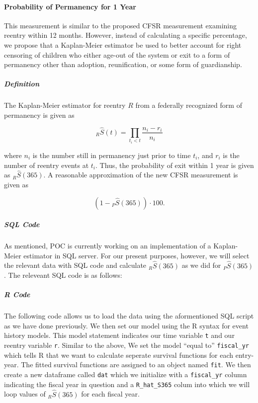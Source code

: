 \documentclass[12pt]{article}\usepackage[]{graphicx}\usepackage[]{color}
\begin{document}
\paragraph{Probability of Permanency for 1 Year} This measurement is similar to the proposed CFSR measurement examining reentry within 12 months. However, instead of calculating a specific percentage, we propose that a Kaplan-Meier estimator be used to better account for right censoring of children who either age-out of the system or exit to a form of permanency other than adoption, reunification, or some form of guardianship.

\subparagraph{Definition} The Kaplan-Meier estimator for reentry $R$ from a federally recognized form of permanency is given as

\begin{equation}\label{eq:KM}
{}_R\hat S(t) = \prod\limits_{t_i<t} \frac{n_i-r_{i}}{n_i}
\end{equation}
 
where $n_{i}$ is the number still in permanency just prior to time $t_{i}$, and $r_{i}$ is the number of reentry events at $t_{i}$. Thus, the probability of exit within 1 year is given as ${}_R\hat S(365)$. A reasonable approximation of the new CFSR measurement is given as

\begin{equation}\label{eq:KM}
(1 - {}_P\hat S(365)) \cdot 100. 
\end{equation}

\subparagraph{SQL Code}

As mentioned, POC is currently working on an implementation of a Kaplan-Meier estimator in SQL server. For our present purposes, however, we will select the relevant data with SQL code and calculate ${}_R\hat S(365)$ as we did for ${}_P\hat S(365)$. The releveant SQL code is as follows: 



\subparagraph{R Code}

The following code allows us to load the data using the aformentioned SQL script as we have done previously. We then set our model using the R syntax for event history models. This model statement indicates our time variable \texttt{t} and our reentry variable \texttt{r}. Similar to the above, We set the model ``equal to'' \texttt{fiscal\_yr} which tells R that we want to calculate seperate survival functions for each entry-year. The fitted survival functions are assigned to an object named \texttt{fit}. We then create a new dataframe called \texttt{dat} which we initialize with a \texttt{fiscal\_yr} column indicating the fiscal year in question and a \texttt{R\_hat\_S365} colum into which we will loop values of ${}_R\hat S(365)$ for each fiscal year. 
\end{document}
